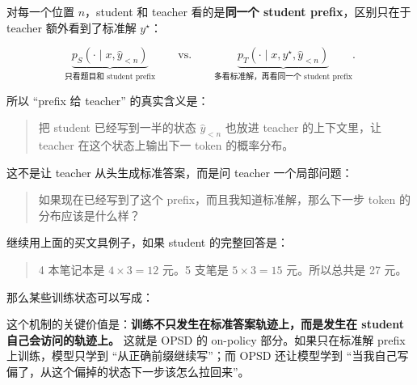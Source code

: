对每一个位置 $n$，student 和 teacher 看的是\textbf{同一个 student prefix}，区别只在于 teacher 额外看到了标准解 $y^\star$：

\[
\underbrace{p_S(\cdot\mid x,\hat y_{<n})}_{\text{只看题目和 student prefix}}
\qquad\text{vs.}\qquad
\underbrace{p_T(\cdot\mid x,y^\star,\hat y_{<n})}_{\text{多看标准解，再看同一个 student prefix}}.
\]

所以 ``prefix 给 teacher'' 的真实含义是：

\begin{quote}
把 student 已经写到一半的状态 $\hat y_{<n}$ 也放进 teacher 的上下文里，让 teacher 在这个状态上输出下一 token 的概率分布。
\end{quote}

这不是让 teacher 从头生成标准答案，而是问 teacher 一个局部问题：

\begin{quote}
如果现在已经写到了这个 prefix，而且我知道标准解，那么下一步 token 的分布应该是什么样？
\end{quote}

继续用上面的买文具例子，如果 student 的完整回答是：

\begin{quote}
4 本笔记本是 $4\times 3=12$ 元。5 支笔是 $5\times 3=15$ 元。所以总共是 27 元。
\end{quote}

那么某些训练状态可以写成：

\begin{center}
\end{center}

这个机制的关键价值是：\textbf{训练不只发生在标准答案轨迹上，而是发生在 student 自己会访问的轨迹上。} 这就是 OPSD 的 on-policy 部分。如果只在标准解 prefix 上训练，模型只学到 ``从正确前缀继续写''；而 OPSD 还让模型学到 ``当我自己写偏了，从这个偏掉的状态下一步该怎么拉回来''。

